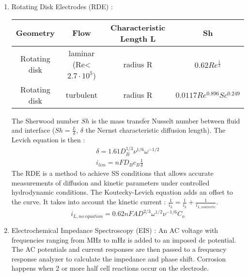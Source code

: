 \documentclass[../main.tex]{subfiles}
\begin{document}
\begin{enumerate}
    \item Rotating Disk Electrodes (RDE) : 
    \begin{table}[hbt!]
        \centering
        \begin{tabular}{c|c|c|c}
            Geometry & Flow & Characteristic Length L & Sh \\
            \hline
            Rotating disk  & laminar (Re<$2.7 \cdot 10^5$) & radius R & $0.62Re^{\frac{1}{2}}$\\
            Rotating disk & turbulent & radius R & $0.0117 Re^{0.896} Sc^{0.249}$\\
        \end{tabular}
    \end{table}
    The Sherwood number $Sh$ is the mass transfer Nusselt number between fluid and interface ($Sh = \frac{L}{\delta}$, $\delta$ the Nernst characteristic diffusion length). The Levich equation is then : \begin{equation}
    \begin{gathered}
        \delta = 1.61 D_B^{1/3} \nu^{1/6} \omega^{-1/2}\\
        i_{lim} = n F D_B c_B \frac{1}{\delta}
        \end{gathered}
    \end{equation}
    The RDE is a method to achieve SS conditions that allows accurate measurements of diffusion and kinetic parameters under controlled hydrodynamic conditions.
    The Koutecky-Levich equation adds an offset to the curve. It takes into account the kinetic current : $\frac{1}{i_L} = \frac{1}{i_k} + \frac{1}{i_{L, no kinetic}}$.\\

    \begin{equation}
        i_{L,no\:equation} = 0.62 n FAD^{2/3} \omega^{1/2} \nu^{-1/6} C_o
    \end{equation}
    
    \item Electrochemical Impedance Spectroscopy (EIS) :
    An AC voltage with frequencies ranging from MHz to mHz is added to an imposed dc potential. The AC potentials and current responses are then passed to a frequency response analyzer to calculate the impedance and phase shift.    
    Corrosion happens when 2 or more half cell reactions occur on the electrode.
    
\end{enumerate}
\end{document}
